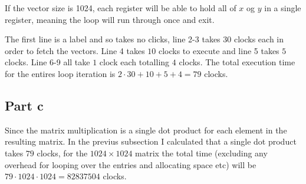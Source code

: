 If the vector size is 1024, each register will be able to hold all of $x$ og $y$
in a single register, meaning the loop will run through once and exit.

The first line is a label and so takes no clicks, line 2-3 takes $30$ clocks
each in order to fetch the vectors. Line 4 takes $10$ clocks to execute and line
5 takes $5$ clocks. Line 6-9 all take $1$ clock each totalling $4$ clocks.
The total execution time for the entires loop iteration is $2 \cdot 30 + 10 + 5
+ 4 = 79$ clocks.


\subsection{Part c}

Since the matrix multiplication is a single dot product for each element in the
resulting matrix. In the previus subsection I calculated that a single dot
product takes $79$ clocks, for the $1024 \times 1024$ matrix the total time
(excluding any overhead for looping over the entries and allocating space etc)
will be $79 \cdot 1024 \cdot 1024 = 82837504$ clocks.
